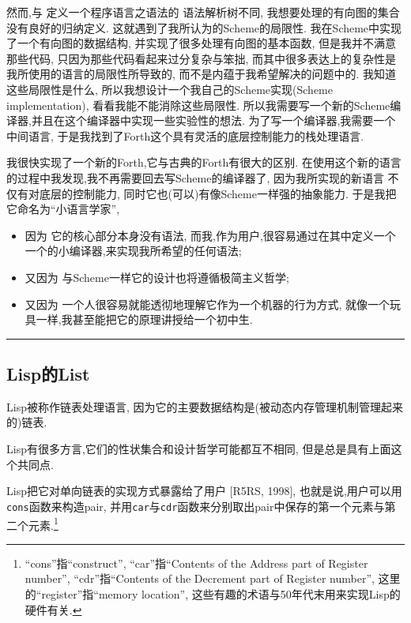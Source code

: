 \documentclass[a4paper]{article}
\begin{document}
然而,与 定义一个程序语言之语法的 语法解析树不同,
我想要处理的有向图的集合没有良好的归纳定义.
这就遇到了我所认为的Scheme的局限性.
我在Scheme中实现了一个有向图的数据结构,
并实现了很多处理有向图的基本函数,
但是我并不满意那些代码,
只因为那些代码看起来过分复杂与笨拙,
而其中很多表达上的复杂性是我所使用的语言的局限性所导致的,
而不是内蕴于我希望解决的问题中的.
我知道这些局限性是什么,
所以我想设计一个我自己的Scheme实现(Scheme implementation),
看看我能不能消除这些局限性.
所以我需要写一个新的Scheme编译器,并且在这个编译器中实现一些实验性的想法.
为了写一个编译器,我需要一个中间语言,
于是我找到了Forth这个具有灵活的底层控制能力的栈处理语言.

我很快实现了一个新的Forth,它与古典的Forth有很大的区别.
在使用这个新的语言的过程中我发现,我不再需要回去写Scheme的编译器了,
因为我所实现的新语言 不仅有对底层的控制能力,
同时它也(可以)有像Scheme一样强的抽象能力.
于是我把它命名为``小语言学家'',

\begin{itemize}
\item 因为 它的核心部分本身没有语法,
而我,作为用户,很容易通过在其中定义一个一个的小编译器,来实现我所希望的任何语法;
\item 又因为 与Scheme一样它的设计也将遵循极简主义哲学;
\item 又因为 一个人很容易就能透彻地理解它作为一个机器的行为方式,
就像一个玩具一样,我甚至能把它的原理讲授给一个初中生.
\end{itemize}


\vspace{.5cm}\hrule\vspace{.5cm}


\subsection{Lisp的List}

Lisp被称作链表处理语言,
因为它的主要数据结构是(被动态内存管理机制管理起来的)链表.

Lisp有很多方言,它们的性状集合和设计哲学可能都互不相同,
但是总是具有上面这个共同点.

Lisp把它对单向链表的实现方式暴露给了用户 [R5RS, 1998],
也就是说,用户可以用\texttt{cons}函数来构造pair,
并用\texttt{car}与\texttt{cdr}函数来分别取出pair中保存的第一个元素与第二个元素.\footnote{``cons''指``construct'',
``car''指``Contents of the Address part of Register number'',
``cdr''指``Contents of the Decrement part of Register number'',
这里的``register''指``memory location'',
这些有趣的术语与50年代末用来实现Lisp的硬件有关.}
\end{document}
